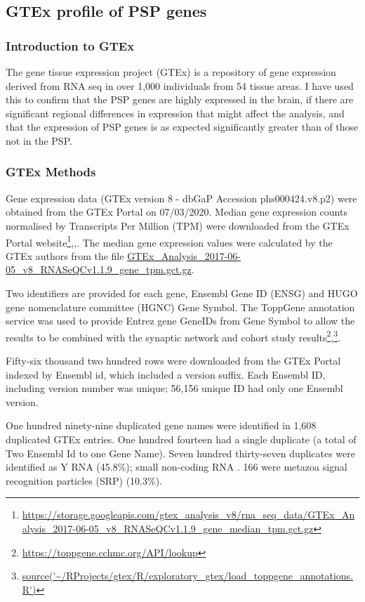 \subsection{GTEx profile of PSP genes}
\label{sec:gtex profile of PSP genes}
\subsubsection{Introduction to GTEx}
The gene tissue expression project (GTEx) is a repository of gene expression derived from RNA seq in over 1,000 individuals from 54 tissue areas\cite{lek2016analysis}. I have used this to confirm that the PSP genes are highly expressed in the brain, if there are significant regional differences in expression that might affect the analysis, and that the expression of PSP genes is as expected significantly greater than of those not in the PSP.

\subsubsection{GTEx Methods}
\label{sec:GTEx methods}
 Gene expression data (GTEx version 8 - dbGaP Accession phs000424.v8.p2) were obtained from the GTEx Portal on 07/03/2020. Median gene expression counts normalised by Transcripts Per Million (TPM) were downloaded from the GTEx Portal website\footnote{\url{https://storage.googleapis.com/gtex_analysis_v8/rna_seq_data/GTEx_Analysis_2017-06-05_v8_RNASeQCv1.1.9_gene_median_tpm.gct.gz}},\cite{gtex2015genotype},\cite{conesa2016survey}. The median gene expression values were calculated by the GTEx authors from the file \url{GTEx_Analysis_2017-06-05_v8_RNASeQCv1.1.9_gene_tpm.gct.gz}. 
 
 Two identifiers are provided for each gene, Ensembl Gene ID (ENSG) and HUGO gene nomenclature committee (HGNC) Gene Symbol\cite{gray2012genenames}. The ToppGene annotation service \cite{chen2009toppgene} was used to provide Entrez gene GeneIDs from Gene Symbol to allow the results to be combined with the synaptic network and cohort study results\footnote{\url{https://toppgene.cchmc.org/API/lookup}},\footnote{\url{source('~/RProjects/gtex/R/exploratory_gtex/load_toppgene_annotations.R')}}.


Fifty-six thousand two hundred rows were downloaded from the GTEx Portal indexed by Ensembl id, which included a version suffix. Each Ensembl ID, including version number was unique; 56,156 unique ID had only one Ensembl version.

One hundred ninety-nine duplicated gene names were identified in 1,608 duplicated GTEx entries. One hundred fourteen had a single duplicate (a total of Two Ensembl Id to one Gene Name). Seven hundred thirty-seven duplicates were identified as Y RNA (45.8\%); small non-coding RNA \cite{perreault2007ro}. 166 were metazoa signal recognition particles (SRP)\cite{keenan2001signal} (10.3\%). 



